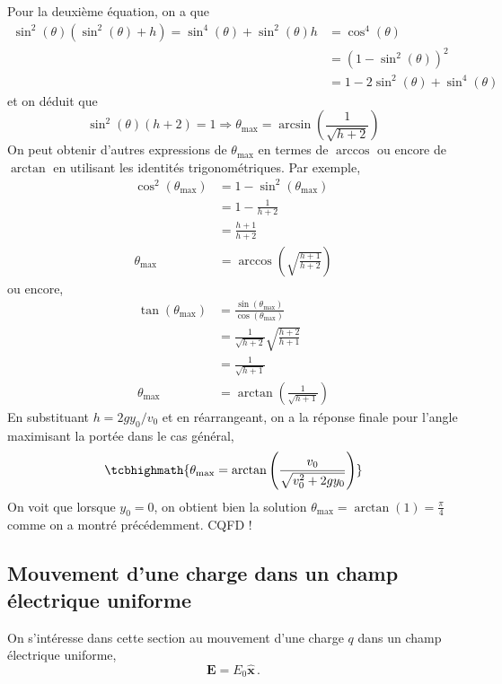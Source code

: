 \documentclass[titlepage]{article}
\theoremstyle{cleanremark}
\begin{document}
\noindent Pour la deuxième équation, on a que
\begin{align}
    \sin^2(\theta)(\sin^2(\theta)+ h)=\sin^4(\theta)+\sin^2(\theta)h&= \cos^4(\theta)
    \\
    &=(1-\sin^2(\theta))^2
    \\
    &= 1 -2\sin^2(\theta) + \sin^4(\theta)
\end{align}
et on déduit que 
\begin{equation}
    \sin^2(\theta)(h + 2) = 1 \Longrightarrow \theta_{\max}=\arcsin\left(\frac{1}{\sqrt{h+2}}\right)
\end{equation}
On peut obtenir d'autres expressions de $\theta_{\max}$ en termes de $\arccos$ ou encore de $\arctan$ en utilisant les identités trigonométriques.
Par exemple, 
\begin{align}
    \cos^2(\theta_{\max})&=1-\sin^2(\theta_{\max})
    \\
    &= 1-\frac{1}{h+2}
    \\
    &=\frac{h+1}{h+2}
    \\
    \theta_{\max}&=\arccos\left(\sqrt{\frac{h+1}{h+2}}\right)
\end{align}
ou encore, 
\begin{align}
    \tan(\theta_{\max})&=\frac{\sin(\theta_{\max})}{\cos(\theta_{\max})}\\
    &= \frac{1}{\sqrt{h+2}}\sqrt{\frac{h+2}{h+1}}
    \\
    &=\frac{1}{\sqrt{h+1}}
    \\
    \theta_{\max}&=\arctan\left(\frac{1}{\sqrt{h+1}}\right)
\end{align}
En substituant $h=2gy_0/v_0$ et en réarrangeant, on a la réponse finale pour l'angle maximisant la portée dans le cas général, 
\begin{equation}
\tcbhighmath{  
    \theta_{\max}= \arctan\left(\frac{v_0}{\sqrt{v_0^2 + 2g y_0}}\right)
}
\end{equation}
On voit que lorsque $y_0=0$, on obtient bien la solution $\theta_{\max}=\arctan(1)=\frac{\pi}{4}$ comme on a montré précédemment. CQFD !

\subsection{Mouvement d'une charge dans un champ électrique uniforme}

On s'intéresse dans cette section au mouvement d'une charge $q$ dans un champ électrique uniforme,
\begin{equation}
    \mathbf{E} = E_0 \hat{\mathbf{x}} \, .
\end{equation}
\end{document}
